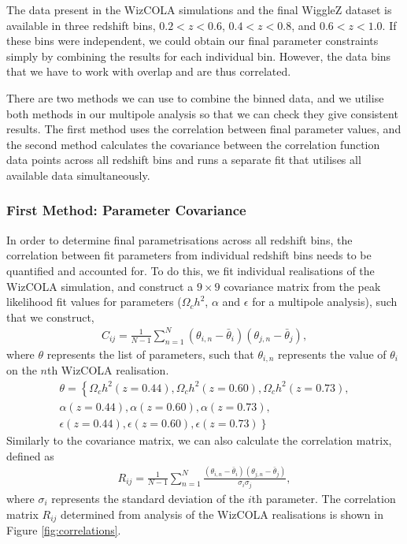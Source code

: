 \documentclass[iop,twocolappendix]{emulateapj}
\begin{document}
The data present in the WizCOLA simulations and the final WiggleZ dataset is available in three redshift bins, $0.2 < z < 0.6$, $0.4 < z < 0.8$, and $0.6 < z < 1.0$. If these bins were independent, we could obtain our final parameter constraints  simply by combining the results for each individual bin. However, the data bins that we have to work with overlap and are thus correlated. 

There are two methods we can use to combine the binned data, and we utilise both methods in our multipole analysis so that we can check they give consistent results. The first method uses the correlation between final parameter values, and the second method calculates the covariance between the correlation function data points across all redshift bins and runs a separate fit that utilises all available data simultaneously.


\subsubsection{First Method: Parameter Covariance} \label{sec:parameterCov}

In order to determine final parametrisations across all redshift bins, the correlation between fit parameters from individual redshift bins needs to be quantified and accounted for. To do this, we fit individual realisations of the WizCOLA simulation, and construct a $9\times 9$ covariance matrix from the peak likelihood fit values for parameters ($\Omega_c h^2$, $\alpha$ and $\epsilon$ for a multipole analysis), %
such that we construct,
\begin{align}
C_{ij} = \frac{1}{N-1} \sum\limits_{n=1}^{N} (\theta_{i,n} - \bar{\theta}_i)(\theta_{j,n} - \bar{\theta}_j),
\end{align}
where $\theta$ represents the list of parameters, such that $\theta_{i,n}$ represents the value of $\theta_i$ on the $n$th WizCOLA realisation.
\begin{align*}
\theta=\left\lbrace \Omega_c h^2 (z = 0.44), \Omega_c h^2 (z = 0.60),  \Omega_c h^2 (z = 0.73), \right. \\ 
\alpha (z = 0.44), \alpha (z = 0.60),  \alpha (z = 0.73), \\
\epsilon (z = 0.44), \left. \epsilon (z = 0.60),  \epsilon (z = 0.73) \right\rbrace
\end{align*}
Similarly to the covariance matrix, we can also calculate the correlation matrix, defined as
\begin{align}
R_{ij} = \frac{1}{N-1} \sum\limits_{n=1}^{N} \frac{(\theta_{i,n} - \bar{\theta}_i)(\theta_{j,n} - \bar{\theta}_{j})}{\sigma_i \sigma_j},
\end{align}
where $\sigma_i$ represents the standard deviation of the $i$th parameter. The correlation matrix $R_{ij}$ determined from analysis of the WizCOLA realisations is shown in Figure \ref{fig:correlations}. 
\end{document}
